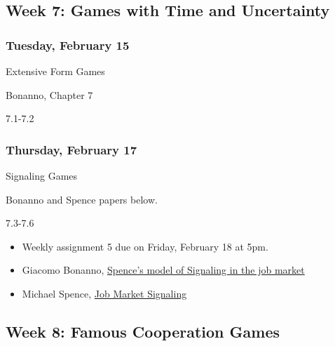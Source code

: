 \documentclass[
]{article}
\providecommand{\tightlist}{%
  \setlength{\itemsep}{0pt}\setlength{\parskip}{0pt}}
\begin{document}
\hypertarget{week-7-games-with-time-and-uncertainty}{%
\subsection{Week 7: Games with Time and
Uncertainty}\label{week-7-games-with-time-and-uncertainty}}

\begin{multicols}{2}

\hypertarget{tuesday-february-15}{%
\subsubsection{Tuesday, February 15}\label{tuesday-february-15}}

\begin{description}
\tightlist
\item[Topic]
Extensive Form Games
\item[Reading]
Bonanno, Chapter 7
\item[Video lectures]
7.1-7.2
\end{description}

\hypertarget{thursday-february-17}{%
\subsubsection{Thursday, February 17}\label{thursday-february-17}}

\begin{description}
\tightlist
\item[Topic]
Signaling Games
\item[Reading]
Bonanno and Spence papers below.
\item[Video lectures]
7.3-7.6
\end{description}

\end{multicols}

\begin{itemize}
\tightlist
\item
  Weekly assignment 5 due on Friday, February 18 at 5pm.
\item
  Giacomo Bonanno,
  \href{http://faculty.econ.ucdavis.edu/faculty/bonanno/teaching/200C/Signaling.pdf}{Spence's
  model of Signaling in the job market}
\item
  Michael Spence, \href{https://www.jstor.org/stable/1882010?seq=1}{Job
  Market Signaling}
\end{itemize}

\hypertarget{week-8-famous-cooperation-games}{%
\subsection{Week 8: Famous Cooperation
Games}\label{week-8-famous-cooperation-games}}
\end{document}
